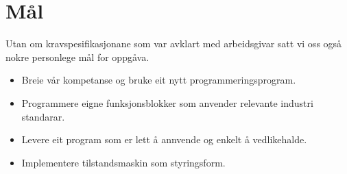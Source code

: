 \section{Mål}
Utan om kravspesifikasjonane som var avklart med arbeidsgivar satt vi oss
også nokre personlege mål for oppgåva.

\begin{itemize}
    \item Breie vår kompetanse og bruke eit nytt programmeringsprogram.
    \item Programmere eigne funksjonsblokker som anvender relevante industri standarar.
    \item Levere eit program som er lett å annvende og enkelt å vedlikehalde.
    \item Implementere tilstandsmaskin som styringsform.
\end{itemize}


